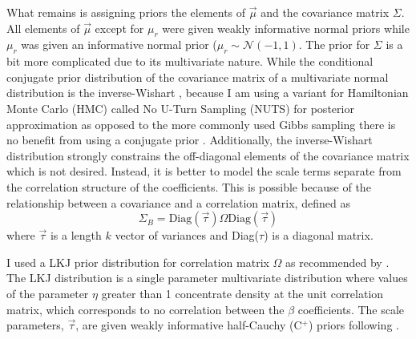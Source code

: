 \documentclass[12pt,letterpaper]{article}
\begin{document}
What remains is assigning priors the elements of \(\vec{\mu}\) and the covariance matrix \(\Sigma\). All elements of \(\vec{\mu}\) except for \(\mu_{r}\) were given weakly informative normal priors while \(\mu_{r}\) was given an informative normal prior (\(\mu_{r} \sim \mathcal{N}(-1, 1)\). The prior for \(\Sigma\) is a bit more complicated due to its multivariate nature. While the conditional conjugate prior distribution of the covariance matrix of a multivariate normal distribution is the inverse-Wishart \citep{Gelman2013d}, because I am using a variant for Hamiltonian Monte Carlo (HMC) called No U-Turn Sampling (NUTS) for posterior approximation as opposed to the more commonly used Gibbs sampling there is no benefit from using a conjugate prior \citet{stan-manual:2014}. Additionally, the inverse-Wishart distribution strongly constrains the off-diagonal elements of the covariance matrix which is not desired. Instead, it is better to model the scale terms separate from the correlation structure of the coefficients. This is possible because of the relationship between a covariance and a correlation matrix, defined as 
\begin{equation}
  \Sigma_{B} = \text{Diag}(\vec{\tau}) \Omega \text{Diag}(\vec{\tau})
  \label{eq:covcor}
\end{equation}
where \(\vec{\tau}\) is a length \(k\) vector of variances and Diag(\(\tau\)) is a diagonal matrix.

I used a LKJ prior distribution for correlation matrix \(\Omega\) as recommended by \citet{stan-manual:2014}. The LKJ distribution is a single parameter multivariate distribution where values of the parameter \(\eta\) greater than 1 concentrate density at the unit correlation matrix, which corresponds to no correlation between the \(\beta\) coefficients. The scale parameters, \(\vec{\tau}\), are given weakly informative half-Cauchy (C\(^{+}\)) priors following \citet{Gelman2006a}.
\end{document}
